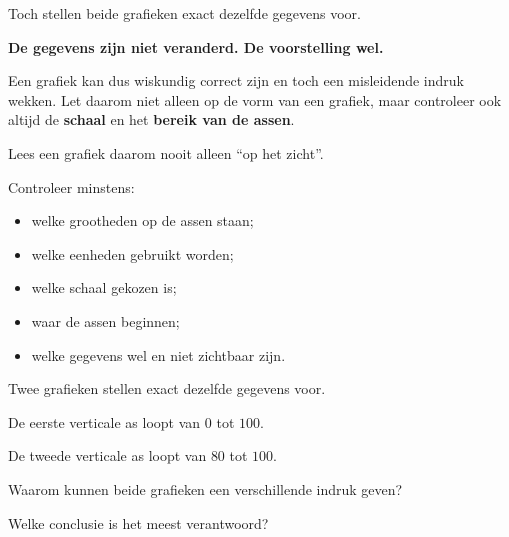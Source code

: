 \documentclass{ximera}
\begin{document}
Toch stellen beide grafieken exact dezelfde gegevens voor.

\begin{center}
    \textbf{De gegevens zijn niet veranderd. De voorstelling wel.}
\end{center}

Een grafiek kan dus wiskundig correct zijn en toch een misleidende indruk
wekken. Let daarom niet alleen op de vorm van een grafiek, maar controleer
ook altijd de \textbf{schaal} en het \textbf{bereik van de assen}.


\begin{opmerking}
Lees een grafiek daarom nooit alleen ``op het zicht''.

Controleer minstens:

\begin{itemize}
  \item welke grootheden op de assen staan;
  \item welke eenheden gebruikt worden;
  \item welke schaal gekozen is;
  \item waar de assen beginnen;
  \item welke gegevens wel en niet zichtbaar zijn.
\end{itemize}
\end{opmerking}


\begin{oefening}{\oefU \ESS}

Twee grafieken stellen exact dezelfde gegevens voor.

De eerste verticale as loopt van $0$ tot $100$.

De tweede verticale as loopt van $80$ tot $100$.

\begin{question}
Waarom kunnen beide grafieken een verschillende indruk geven?

\begin{multipleChoice}
\end{multipleChoice}
\end{question}

\begin{question}
Welke conclusie is het meest verantwoord?

\begin{multipleChoice}
\end{multipleChoice}
\end{question}

\end{oefening}
\end{document}
